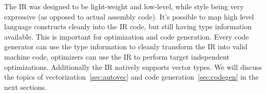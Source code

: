 The IR was designed to be light-weight and low-level, while style being very expressive (as opposed to actual assembly code).
It's possible to map high level language constructs cleanly into the IR code, but still having type information available.
This is important for optimization and code generation. Every code generator can use the type information to cleanly transform
the IR into valid machine code, optimizers can use the IR to perform target independent optimizations.
Additionally the IR natively supports vector types. We will discuss the topics of vectorization~\ref{sec:autovec} 
and code generation~\ref{sec:codegen} in the next sections.